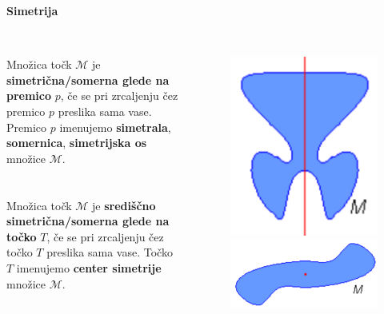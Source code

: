         \begin{frame}
            \large\textbf{Simetrija}
            ~\\
            ~\\
            \normalsize
            \begin{columns}
                Množica točk $\mathcal{M}$ je \textbf{simetrična/somerna glede na premico} $p$, če se pri zrcaljenju čez premico $p$ preslika sama vase. Premico $p$ imenujemo \textbf{simetrala}, \textbf{somernica}, \textbf{simetrijska os} množice $\mathcal{M}$. \\
                 ~\\      
                 ~\\      
                Množica točk $\mathcal{M}$ je \textbf{središčno simetrična/somerna glede na točko} $T$, če se pri zrcaljenju čez točko $T$ preslika sama vase. Točko $T$ imenujemo \textbf{center simetrije} množice $\mathcal{M}$. 
                \begin{figure}
                    \includegraphics[scale=0.25]{Slike in skice/Simetrija glede na premico.png}

                    \includegraphics[scale=0.25]{Slike in skice/Simetrija glede na točko.png}
                \end{figure}
            \end{columns}


        \end{frame}

